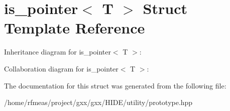 \hypertarget{structis__pointer}{}\section{is\+\_\+pointer$<$ T $>$ Struct Template Reference}
\label{structis__pointer}


Inheritance diagram for is\+\_\+pointer$<$ T $>$\+:


Collaboration diagram for is\+\_\+pointer$<$ T $>$\+:


The documentation for this struct was generated from the following file\+:\begin{DoxyCompactItemize}
\item 
/home/rfmeas/project/gxx/gxx/\+H\+I\+D\+E/utility/prototype.\+hpp\end{DoxyCompactItemize}
